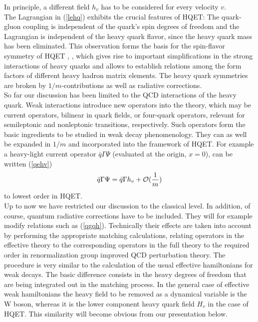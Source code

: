 In principle, a different field $h_v$ has to be considered for every
velocity $v$.
\\
The Lagrangian in (\ref{lehq}) exhibits the crucial features of HQET:
The quark-gluon coupling is independent of the quark's spin degrees of
freedom and the Lagrangian is independent of the heavy quark flavor,
since the heavy quark mass has been eliminated. This observation forms
the basis for the spin-flavor symmetry of HQET \cite{isgurwise:89},
\cite{isgurwise:90}, which gives rise to important simplifications in
the strong interactions of heavy quarks and allows to establish
relations among the form factors of different heavy hadron matrix
elements. The heavy quark symmetries are broken by $1/m$-contributions
as well as radiative corrections.
\\
So far our discussion has been limited to the QCD interactions of the
heavy quark. Weak interactions introduce new operators into the theory,
which may be current operators, bilinear in quark fields, or four-quark
operators, relevant for semileptonic and nonleptonic transitions,
respectively. Such operators form the basic ingredients to be studied in
weak decay phenomenology. They can as well be expanded in $1/m$ and
incorporated into the framework of HQET. For example a heavy-light current
operator $\bar q\Gamma \Psi$ (evaluated at the origin, $x=0$), can be
written (\ref{qehv})
\begin{equation}\label{qgqh}
\bar q\Gamma \Psi=\bar q\Gamma h_v+{\cal O}(\frac{1}{m})
\end{equation}
to lowest order in HQET.
\\
Up to now we have restricted our discussion to the classical level. In
addition, of course, quantum radiative corrections have to be
included. They will for example modify relations such as (\ref{qgqh}).
Technically their effects are taken into account by performing the
appropriate matching calculations, relating operators in the effective
theory to the corresponding operators in the full theory to the
required order in renormalization group improved QCD perturbation theory.
The procedure is very similar to the calculation of the usual effective hamiltonians
for weak decays. The basic difference consists in the heavy degrees of
freedom that are being integrated out in the matching process. In the
general case of effective weak hamiltonians the heavy field to be 
removed as a dynamical variable is the W boson, whereas it is the lower
component heavy quark field $H_v$ in the case of HQET. This similarity
will become obvious from our presentation below.
